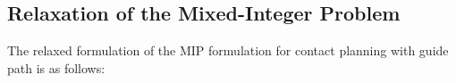 \subsection{Relaxation of the Mixed-Integer Problem}
\label{sub:mip:sl1m}
The relaxed formulation of the MIP formulation for contact planning with guide path \cite{sl1m_v2} is as follows:
